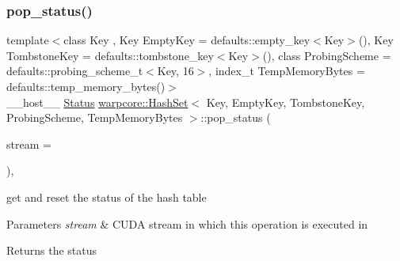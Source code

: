 \subsubsection{\texorpdfstring{pop\+\_\+status()}{pop\_status()}}
{\footnotesize\ttfamily template$<$class Key , Key Empty\+Key = defaults\+::empty\+\_\+key$<$\+Key$>$(), Key Tombstone\+Key = defaults\+::tombstone\+\_\+key$<$\+Key$>$(), class Probing\+Scheme  = defaults\+::probing\+\_\+scheme\+\_\+t$<$\+Key, 16$>$, index\+\_\+t Temp\+Memory\+Bytes = defaults\+::temp\+\_\+memory\+\_\+bytes()$>$ \\
\+\_\+\+\_\+host\+\_\+\+\_\+ \hyperlink{classwarpcore_1_1Status}{Status} \hyperlink{classwarpcore_1_1HashSet}{warpcore\+::\+Hash\+Set}$<$ Key, Empty\+Key, Tombstone\+Key, Probing\+Scheme, Temp\+Memory\+Bytes $>$\+::pop\+\_\+status (\begin{DoxyParamCaption}\item[{cuda\+Stream\+\_\+t}]{stream = {} }\end{DoxyParamCaption})\hspace{0.3cm}{\ttfamily [inline]}, {\ttfamily [noexcept]}}



get and reset the status of the hash table 


\begin{DoxyParams}{Parameters}
{\em stream} & C\+U\+DA stream in which this operation is executed in \\
\hline
\end{DoxyParams}
\begin{DoxyReturn}{Returns}
the status 
\end{DoxyReturn}
\mbox{\label{classwarpcore_1_1HashSet_a3be33bdea6aabe4075b7e6f9a3741021}} 
